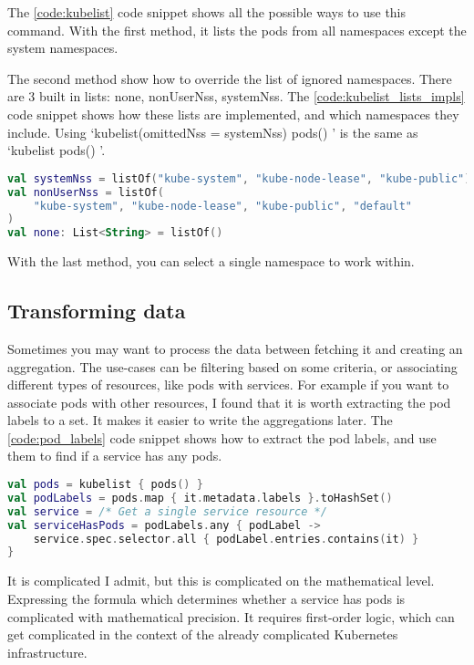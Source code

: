 The \ref{code:kubelist} code snippet shows all the possible ways to use this command. With the first method, it lists the pods from all namespaces except the system namespaces.

The second method show how to override the list of ignored namespaces. There are 3 built in lists: none, nonUserNss, systemNss. The \ref{code:kubelist_lists_impls} code snippet shows how these lists are implemented, and which namespaces they include. Using `kubelist(omittedNss = systemNss) { pods() }' is the same as `kubelist { pods() }'.

\begin{minipage}{\linewidth}
\begin{lstlisting}[caption={Usages of kubelist},language=Kotlin,label=code:kubelist_lists_impls]
val systemNss = listOf("kube-system", "kube-node-lease", "kube-public")
val nonUserNss = listOf(
    "kube-system", "kube-node-lease", "kube-public", "default"
)
val none: List<String> = listOf()
\end{lstlisting}
\end{minipage}

With the last method, you can select a single namespace to work within.

\subsection{Transforming data}

Sometimes you may want to process the data between fetching it and creating an aggregation. The use-cases can be filtering based on some criteria, or associating different types of resources, like pods with services. For example if you want to associate pods with other resources, I found that it is worth extracting the pod labels to a set. It makes it easier to write the aggregations later. The \ref{code:pod_labels} code snippet shows how to extract the pod labels, and use them to find if a service has any pods.

\begin{lstlisting}[caption={Extraction of pod labels},language=Kotlin,label=code:pod_labels]
val pods = kubelist { pods() }
val podLabels = pods.map { it.metadata.labels }.toHashSet()
val service = /* Get a single service resource */
val serviceHasPods = podLabels.any { podLabel ->
    service.spec.selector.all { podLabel.entries.contains(it) }
}
\end{lstlisting}

It is complicated I admit, but this is complicated on the mathematical level. Expressing the formula which determines whether a service has pods is complicated with mathematical precision. It requires first-order logic, which can get complicated in the context of the already complicated Kubernetes infrastructure.

